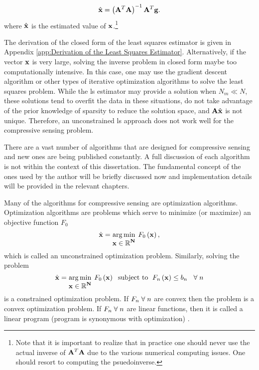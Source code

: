 \begin{equation}
	\hat{ \displaystyle \mathbf{x} } = \left( \displaystyle \mathbf{A}^T \displaystyle \mathbf{A} \right)^{-1} \displaystyle \mathbf{A}^T \displaystyle \mathbf{g}.
\end{equation}
where $\hat{ \displaystyle \mathbf{x} }$ is the estimated value of $\displaystyle \mathbf{x}$.\footnote{Note that it is important to realize that in practice one should never use the actual inverse of $\displaystyle \mathbf{A}^T \displaystyle \mathbf{A}$ due to the various numerical computing issues. One should resort to computing the psuedoinverse.}

The derivation of the closed form of the least squares estimator is given in Appendix \ref{app:Derivation of the Least Squares Estimator}. Alternatively, if the vector $\displaystyle \mathbf{x}$ is very large, solving the inverse problem in closed form maybe too computationally intensive. In this case, one may use the gradient descent algorithm or other types of iterative optimization algorithms to solve the least squares problem. While the \gls{ls} estimator may provide a solution when $N_m \ll N$, these solutions tend to overfit the data in these situations, do not take advantage of the prior knowledge of sparsity to reduce the solution space, and $\displaystyle \mathbf{A}\hat{ \displaystyle \mathbf{x} }$ is not unique. Therefore, an unconstrained \gls{ls} approach does not work well for the compressive sensing problem.

There are a vast number of algorithms that are designed for compressive sensing and new ones are being published constantly. A full discussion of each algorithm is not within the context of this dissertation. The fundamental concept of the ones used by the author will be briefly discussed now and implementation details will be provided in the relevant chapters. 

Many of the algorithms for compressive sensing are optimization algorithms. Optimization algorithms are problems which serve to minimize (or maximize) an objective function $F_0$
%
\begin{equation}
	\hat{ \displaystyle \mathbf{x} } = \operatorname*{arg\,min}_{\displaystyle \mathbf{x \in \mathbb{R}^N }} \: F_0 \left( \displaystyle \mathbf{x} \right),
\end{equation}
%
which is called an unconstrained optimization problem. Similarly, solving the problem
%
\begin{equation}
	\hat{ \displaystyle \mathbf{x} } = \operatorname*{arg\,min}_{\displaystyle \mathbf{x \in \mathbb{R}^N }} \: F_0 \left( \displaystyle \mathbf{x} \right) \text{\; subject to \;} F_n \left( \displaystyle \mathbf{x} \right) \leq b_n \text{\; \;}\forall \text{\;} n
\end{equation}
%
is a constrained optimization problem. If $F_n \text{\;}\forall \text{\;} n$ are convex then the problem is a convex optimization problem. If  $F_n \text{\;}\forall \text{\;}n$ are linear functions, then it is called a linear program (program is synonymous with optimization) \cite{foucart2013mathematical}.

